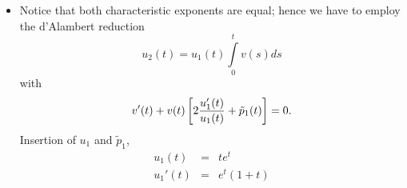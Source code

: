 {\begin{enumerate}
\begin{itemize}
\begin{eqnarray}
         w_n\Bigl[(n+\sigma)(n+\sigma-2)+1\Bigr]-
            w_{n-1}(n+\sigma-1)&=&0. \label{eqn:5.3.2}
      \end{eqnarray}
      ad (\ref{eqn:5.3.1}) for $w_0$:
      \begin{eqnarray*}
         \sigma(\sigma-2)+1&=&0\\
         \sigma^2-2\sigma+1&=&0\\
         (\sigma-1)^2&=&0\quad \Longrightarrow\ \sigma_\infty^{(1,2)}=1
      \end{eqnarray*}
      The characteristic exponent is $\sigma_\infty^{(1)}=
      \sigma_\infty^{(2)}=1$.\medskip\\
      ad (\ref{eqn:5.3.2}) for $w_n$:
      For the coefficients $w_n$ we obtain the recursion formula
      \begin{eqnarray*}
         w_n\Bigl[(n+\sigma)(n+\sigma-2)+1\Bigr]&=&w_{n-1}(n+\sigma-1)\\
         \Longrightarrow\ w_n&=&{n+\sigma-1\over (n+\sigma)(n+\sigma-2)+1}
         w_{n-1}.
      \end{eqnarray*}
      Let us insert $\sigma=1$:
      $$
         w_n={n\over (n+1)(n-1)+1}w_{n-1}={n\over n^2-1+1}w_{n-1}=
         {n\over n^2}w_{n-1}={1\over n}w_{n-1}.
      $$
      We can fix $w_0=1$, hence:
      \begin{eqnarray*}
         w_0&=&1={1\over 1}={1\over 0!}\\
         w_1&=&{1\over 1}={1\over 1!}\\
         w_2&=&{1\over 1\cdot 2}={1\over 2!}\\
         w_3&=&{1\over 1\cdot 2\cdot 3}={1\over 3!}\\
         &\vdots\\
         w_n&=&{1\over 1\cdot 2\cdot 3\cdot\,\cdots\,\cdot n}={1\over n!}
      \end{eqnarray*}
      And finally,
      $$
         u_1(t)=t^\sigma\sum_{n=0}^\infty w_n t^n=t\sum_{n=0}^\infty
         {t^n\over n!}=te^t .
      $$
\item Notice that both characteristic exponents are equal; hence we have to employ  the
d'Alambert reduction
      $$
         u_2(t)=u_1(t)\int\limits_0^t v(s)ds
      $$
      with
      $$
         v'(t)+v(t)\left[2{u_1'(t)\over u_1(t)}+\tilde p_1(t)\right]=0.
      $$
     Insertion of $u_1$ and $\tilde p_1$,
      \begin{eqnarray*}
         u_1(t)&=&te^t\\
         u_1'(t)&=&e^t(1+t)\\

\end{eqnarray*}
\end{itemize}
\end{enumerate}}
